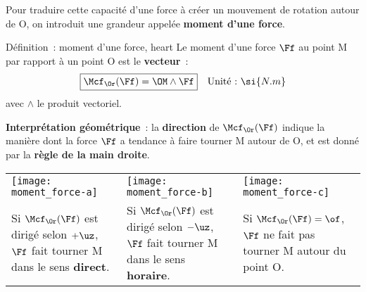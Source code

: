 \documentclass[../main/main.tex]{subfiles}
\begin{document}
Pour traduire cette capacité d'une force à créer un mouvement de rotation autour
de O, on introduit une grandeur appelée \textbf{moment d'une force}.

\begin{tdefi}{Définition~: moment d'une force, heart}
    Le moment d'une force $\Ff$ au point M par rapport à un point O est le
    \textbf{vecteur}~:
    \[\boxed{\Mcf_{\Or}(\Ff) = \OM\wedge\Ff}\quad\text{Unité~:~}\si{N.m}\]
    avec $\wedge$ le produit vectoriel.
\end{tdefi}

\textbf{Interprétation géométrique}~: la \textbf{direction} de
$\Mcf_{\Or}(\Ff)$ indique la manière dont la force $\Ff$ a tendance à faire
tourner M autour de O, et est donné par la \textbf{règle de la main droite}.
\begin{center}
    \begin{tabularx}{\linewidth}{YYY}
        \texttt{[image: moment\_force-a]} &
        \texttt{[image: moment\_force-b]} &
        \texttt{[image: moment\_force-c]}
        \\
        Si $\Mcf_{\Or}(\Ff)$ est dirigé selon $+\uz$, $\Ff$ fait tourner M dans
        le sens \textbf{direct}. &
        Si $\Mcf_{\Or}(\Ff)$ est dirigé selon $-\uz$, $\Ff$ fait tourner M dans
        le sens \textbf{horaire}. &
        Si $\Mcf_{\Or}(\Ff) = \of$, $\Ff$ ne fait pas tourner M autour du point
        O.
    \end{tabularx}
\end{center}
\end{document}
